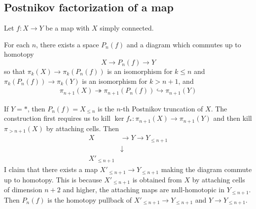\documentclass[12pt]{article}
\begin{document}
\subsection{Postnikov factorization of a map}
Let $f:X \to Y$ be a map with $X$ simply connected.\begin{theorem}
    For each $n$, there exists a space $P_n(f)$ and a diagram which commutes up to homotopy
    \[ X \to P_n(f) \to Y \]
    so that $\pi_k(X) \to \pi_k(P_n(f))$ is an isomorphism for $k \leq n$ and $\pi_k(P_n(f)) \to \pi_k(Y)$ is an isomorphism for $k > n+1$, and \begin{align*}
        \pi_{n+1}(X) \twoheadrightarrow \pi_{n+1}(P_n(f)) \hookrightarrow \pi_{n+1}(Y)
    \end{align*} 
\end{theorem}
If $Y = *$, then $P_n(f) = X_{\leq n}$ is the $n$-th Postnikov truncation of $X$. The construction first requires us to kill $\ker f_*: \pi_{n+1}(X) \to \pi_{n+1}(Y)$ and then kill $\pi_{>n+1}(X)$ by attaching cells. Then \begin{align*}
    X &\to Y \to Y_{\leq n+1}\\
&\downarrow \\
X'_{\leq n+1}
\end{align*} I claim that there exists a map $X'_{\leq n+1} \to Y_{\leq n+1}$ making the diagram commute up to homotopy. This is because $X'_{\leq n+1}$ is obtained from $X$ by attaching cells of dimension $n+2$ and higher, the attaching maps are null-homotopic in $Y_{\leq n+1}$.
Then $P_n(f)$ is the homotopy pullback of $X'_{\leq n+1} \to Y_{\leq n+1}$ and $Y \to Y_{\leq n+1}$.
\end{document}
